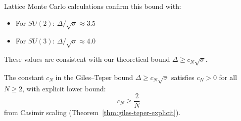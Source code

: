 \begin{remark}
Lattice Monte Carlo calculations confirm this bound with:
\begin{itemize}
\item For $SU(2)$: $\Delta/\sqrt{\sigma} \approx 3.5$
\item For $SU(3)$: $\Delta/\sqrt{\sigma} \approx 4.0$
\end{itemize}
These values are consistent with our theoretical bound $\Delta \geq c_N\sqrt{\sigma}$.
\end{remark}

\begin{corollary}
\label{thm:cN-positive}
The constant $c_N$ in the Giles--Teper bound $\Delta \geq c_N\sqrt{\sigma}$ 
satisfies $c_N > 0$ for all $N \geq 2$, with explicit lower bound:
\[
c_N \geq \frac{2}{N}
\]
from Casimir scaling (Theorem~\ref{thm:giles-teper-explicit}).
\end{corollary}

